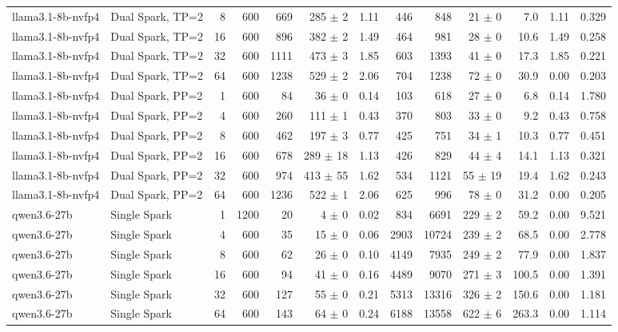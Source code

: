\begin{tabular}{l l r r r r r r r r r r r}
llama3.1-8b-nvfp4 & Dual Spark, TP=2 & 8 & 600 & 669 & 285 $\pm$ 2 & 1.11 & 446 & 848 & 21 $\pm$ 0 & 7.0 & 1.11 & 0.329 \\
llama3.1-8b-nvfp4 & Dual Spark, TP=2 & 16 & 600 & 896 & 382 $\pm$ 2 & 1.49 & 464 & 981 & 28 $\pm$ 0 & 10.6 & 1.49 & 0.258 \\
llama3.1-8b-nvfp4 & Dual Spark, TP=2 & 32 & 600 & 1111 & 473 $\pm$ 3 & 1.85 & 603 & 1393 & 41 $\pm$ 0 & 17.3 & 1.85 & 0.221 \\
llama3.1-8b-nvfp4 & Dual Spark, TP=2 & 64 & 600 & 1238 & 529 $\pm$ 2 & 2.06 & 704 & 1238 & 72 $\pm$ 0 & 30.9 & 0.00 & 0.203 \\
\addlinespace
llama3.1-8b-nvfp4 & Dual Spark, PP=2 & 1 & 600 & 84\rlap{$^\dagger$} & 36 $\pm$ 0 & 0.14 & 103 & 618 & 27 $\pm$ 0 & 6.8 & 0.14 & 1.780 \\
llama3.1-8b-nvfp4 & Dual Spark, PP=2 & 4 & 600 & 260 & 111 $\pm$ 1 & 0.43 & 370 & 803 & 33 $\pm$ 0 & 9.2 & 0.43 & 0.758 \\
llama3.1-8b-nvfp4 & Dual Spark, PP=2 & 8 & 600 & 462 & 197 $\pm$ 3 & 0.77 & 425 & 751 & 34 $\pm$ 1 & 10.3 & 0.77 & 0.451 \\
llama3.1-8b-nvfp4 & Dual Spark, PP=2 & 16 & 600 & 678 & 289 $\pm$ 18 & 1.13 & 426 & 829 & 44 $\pm$ 4 & 14.1 & 1.13 & 0.321 \\
llama3.1-8b-nvfp4 & Dual Spark, PP=2 & 32 & 600 & 974 & 413 $\pm$ 55 & 1.62 & 534 & 1121 & 55 $\pm$ 19 & 19.4 & 1.62 & 0.243 \\
llama3.1-8b-nvfp4 & Dual Spark, PP=2 & 64 & 600 & 1236 & 522 $\pm$ 1 & 2.06 & 625 & 996 & 78 $\pm$ 0 & 31.2 & 0.00 & 0.205 \\
\addlinespace
qwen3.6-27b & Single Spark & 1 & 1200 & 20\rlap{$^\dagger$} & 4 $\pm$ 0 & 0.02 & 834 & 6691 & 229 $\pm$ 2 & 59.2 & 0.00 & 9.521 \\
qwen3.6-27b & Single Spark & 4 & 600 & 35\rlap{$^\dagger$} & 15 $\pm$ 0 & 0.06 & 2903 & 10724 & 239 $\pm$ 2 & 68.5 & 0.00 & 2.778 \\
qwen3.6-27b & Single Spark & 8 & 600 & 62\rlap{$^\dagger$} & 26 $\pm$ 0 & 0.10 & 4149 & 7935 & 249 $\pm$ 2 & 77.9 & 0.00 & 1.837 \\
qwen3.6-27b & Single Spark & 16 & 600 & 94\rlap{$^\dagger$} & 41 $\pm$ 0 & 0.16 & 4489 & 9070 & 271 $\pm$ 3 & 100.5 & 0.00 & 1.391 \\
qwen3.6-27b & Single Spark & 32 & 600 & 127 & 55 $\pm$ 0 & 0.21 & 5313 & 13316 & 326 $\pm$ 2 & 150.6 & 0.00 & 1.181 \\
qwen3.6-27b & Single Spark & 64 & 600 & 143 & 64 $\pm$ 0 & 0.24 & 6188 & 13558 & 622 $\pm$ 6 & 263.3 & 0.00 & 1.114 \\

\end{tabular}
